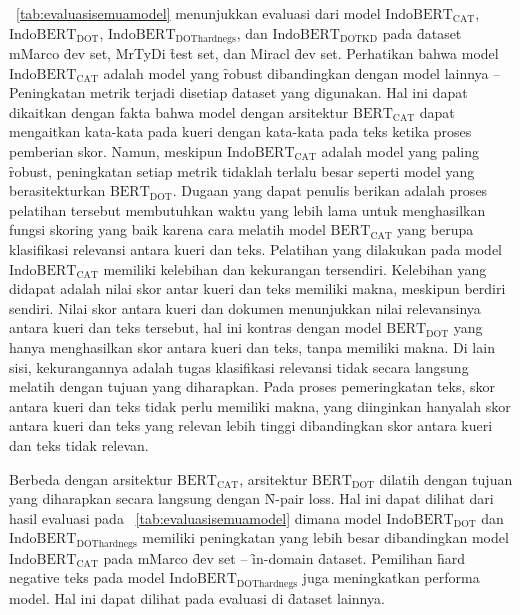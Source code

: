 \tab~\ref{tab:evaluasisemuamodel} menunjukkan evaluasi dari model $\text{IndoBERT}_{\text{CAT}}$, $\text{IndoBERT}_{\text{DOT}}$, $\text{IndoBERT}_{\text{DOThardnegs}}$, dan $\text{IndoBERT}_{\text{DOTKD}}$ pada \f{dataset} mMarco \f{dev set}, MrTyDi \f{test set}, dan Miracl \f{dev set}. Perhatikan bahwa model $\text{IndoBERT}_{\text{CAT}}$ adalah model yang \f{robust} dibandingkan dengan model lainnya -- Peningkatan metrik terjadi disetiap \f{dataset} yang digunakan. Hal ini dapat dikaitkan dengan fakta bahwa model dengan arsitektur $\text{BERT}_{\text{CAT}}$ dapat mengaitkan kata-kata pada kueri dengan kata-kata pada teks ketika proses pemberian skor. Namun, meskipun $\text{IndoBERT}_{\text{CAT}}$ adalah model yang paling \f{robust}, peningkatan setiap metrik tidaklah terlalu besar seperti model yang berasitekturkan $\text{BERT}_{\text{DOT}}$. Dugaan yang dapat penulis berikan adalah proses pelatihan tersebut membutuhkan waktu yang lebih lama untuk menghasilkan fungsi skoring yang baik karena cara melatih model $\text{BERT}_{\text{CAT}}$ yang berupa klasifikasi relevansi antara kueri dan teks. Pelatihan yang dilakukan pada model $\text{IndoBERT}_{\text{CAT}}$ memiliki kelebihan dan kekurangan tersendiri. Kelebihan yang didapat adalah nilai skor antar kueri dan teks memiliki makna, meskipun berdiri sendiri. Nilai skor antara kueri dan dokumen menunjukkan nilai relevansinya antara kueri dan teks tersebut, hal ini kontras dengan model $\text{BERT}_{\text{DOT}}$ yang hanya menghasilkan skor antara kueri dan teks, tanpa memiliki makna. Di lain sisi, kekurangannya adalah tugas klasifikasi relevansi tidak secara langsung melatih dengan tujuan yang diharapkan. Pada proses pemeringkatan teks, skor antara kueri dan teks tidak perlu memiliki makna, yang diinginkan hanyalah skor antara kueri dan teks yang relevan lebih tinggi dibandingkan skor antara kueri dan teks tidak relevan. 

Berbeda dengan arsitektur $\text{BERT}_{\text{CAT}}$, arsitektur $\text{BERT}_{\text{DOT}}$ dilatih dengan tujuan yang diharapkan secara langsung dengan \f{N-pair loss}. Hal ini dapat dilihat dari hasil evaluasi pada \tab~\ref{tab:evaluasisemuamodel} dimana model $\text{IndoBERT}_{\text{DOT}}$ dan $\text{IndoBERT}_{\text{DOThardnegs}}$ memiliki peningkatan yang lebih besar dibandingkan model $\text{IndoBERT}_{\text{CAT}}$ pada mMarco \f{dev set} -- \f{in-domain} \f{dataset}. Pemilihan \f{hard negative} teks pada model $\text{IndoBERT}_{\text{DOThardnegs}}$ juga meningkatkan performa model. Hal ini dapat dilihat pada evaluasi di \f{dataset} lainnya.

